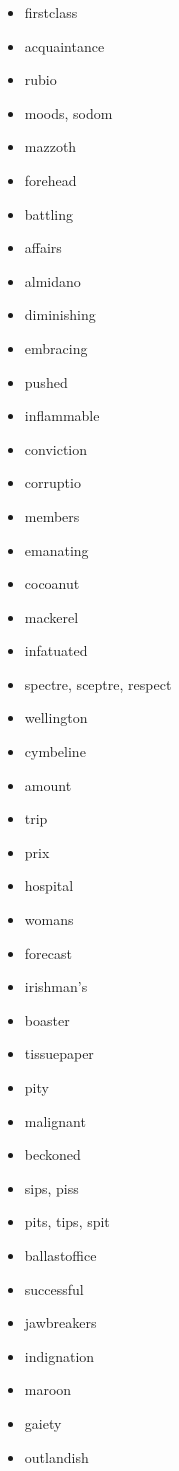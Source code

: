 \documentclass{article}
\begin{document}
\begin{itemize}
    \item firstclass
    \item acquaintance
    \item rubio
    \item moods, sodom
    \item mazzoth
    \item forehead
    \item battling
    \item affairs
    \item almidano
    \item diminishing
    \item embracing
    \item pushed
    \item inflammable
    \item conviction
    \item corruptio
    \item members
    \item emanating
    \item cocoanut
    \item mackerel
    \item infatuated
    \item spectre, sceptre, respect
    \item wellington
    \item cymbeline
    \item amount
    \item trip
    \item prix
    \item hospital
    \item womans
    \item forecast
    \item irishman's
    \item boaster
    \item tissuepaper
    \item pity
    \item malignant
    \item beckoned
    \item sips, piss
    \item pits, tips, spit
    \item ballastoffice
    \item successful
    \item jawbreakers
    \item indignation
    \item maroon
    \item gaiety
    \item outlandish

\end{itemize}
\end{document}
